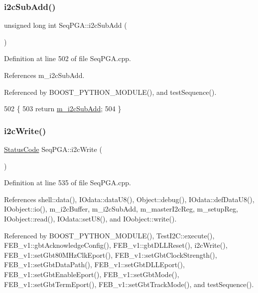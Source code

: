\subsubsection{\texorpdfstring{i2c\+Sub\+Add()}{i2cSubAdd()}}
{\footnotesize\ttfamily unsigned long int Seq\+P\+G\+A\+::i2c\+Sub\+Add (\begin{DoxyParamCaption}{ }\end{DoxyParamCaption})}



Definition at line 502 of file Seq\+P\+G\+A.\+cpp.



References m\+\_\+i2c\+Sub\+Add.



Referenced by B\+O\+O\+S\+T\+\_\+\+P\+Y\+T\+H\+O\+N\+\_\+\+M\+O\+D\+U\+L\+E(), and test\+Sequence().


\begin{DoxyCode}
502                                    \{
503   \textcolor{keywordflow}{return} \hyperlink{classSeqPGA_a82bda98edb9681aff47733e83ac8bc4f}{m\_i2cSubAdd}; 
504 \}
\end{DoxyCode}
\mbox{\label{classSeqPGA_a429076ca3a4ece94182bd95c623bb9d0}} 
\subsubsection{\texorpdfstring{i2c\+Write()}{i2cWrite()}\hspace{0.1cm}{\footnotesize\ttfamily [1/2]}}
{\footnotesize\ttfamily \hyperlink{classStatusCode}{Status\+Code} Seq\+P\+G\+A\+::i2c\+Write (\begin{DoxyParamCaption}{ }\end{DoxyParamCaption})}



Definition at line 535 of file Seq\+P\+G\+A.\+cpp.



References shell\+::data(), I\+Odata\+::data\+U8(), Object\+::debug(), I\+Odata\+::def\+Data\+U8(), I\+Oobject\+::io(), m\+\_\+i2c\+Buffer, m\+\_\+i2c\+Sub\+Add, m\+\_\+master\+I2c\+Reg, m\+\_\+setup\+Reg, I\+Oobject\+::read(), I\+Odata\+::set\+U8(), and I\+Oobject\+::write().



Referenced by B\+O\+O\+S\+T\+\_\+\+P\+Y\+T\+H\+O\+N\+\_\+\+M\+O\+D\+U\+L\+E(), Test\+I2\+C\+::execute(), F\+E\+B\+\_\+v1\+::gbt\+Acknowledge\+Config(), F\+E\+B\+\_\+v1\+::gbt\+D\+L\+L\+Reset(), i2c\+Write(), F\+E\+B\+\_\+v1\+::set\+Gbt80\+M\+Hz\+Clk\+Eport(), F\+E\+B\+\_\+v1\+::set\+Gbt\+Clock\+Strength(), F\+E\+B\+\_\+v1\+::set\+Gbt\+Data\+Path(), F\+E\+B\+\_\+v1\+::set\+Gbt\+D\+L\+L\+Eport(), F\+E\+B\+\_\+v1\+::set\+Gbt\+Enable\+Eport(), F\+E\+B\+\_\+v1\+::set\+Gbt\+Mode(), F\+E\+B\+\_\+v1\+::set\+Gbt\+Term\+Eport(), F\+E\+B\+\_\+v1\+::set\+Gbt\+Track\+Mode(), and test\+Sequence().


